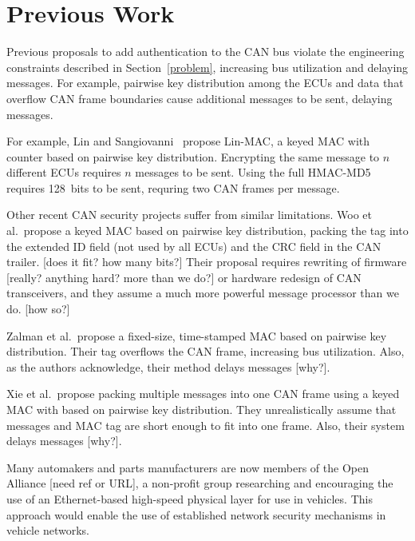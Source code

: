 \section{Previous Work}
\label{previous}

Previous proposals to add authentication to the CAN bus violate the engineering constraints described
in Section~\ref{problem}, increasing bus utilization and delaying messages.  For example, pairwise
key distribution among the ECUs and data that overflow CAN frame boundaries cause additional messages to be sent,
delaying messages.

For example, Lin and Sangiovanni~\cite{Lin-MAC} propose Lin-MAC, a keyed MAC with counter based on
pairwise key distribution.  Encrypting the same message to $n$ different ECUs requires $n$
messages to be sent.   Using the full HMAC-MD5 requires 128~bits to be sent, requring two CAN frames per message.

Other recent CAN security projects suffer from similar limitations. 
Woo et al.\ propose a keyed MAC based on pairwise key distribution,
packing the tag into the extended ID field (not used by all ECUs) and the CRC field in the CAN trailer. 
[does it fit? how many bits?]  Their proposal requires 
rewriting of firmware [really? anything hard? more than we do?] or hardware redesign of CAN transceivers, and 
they assume a much more powerful message processor than we do. [how so?]

Zalman et al.\ propose a fixed-size, time-stamped MAC based on pairwise key distribution.
Their tag overflows the CAN frame, increasing bus utilization.  Also, as the authors acknowledge,
their method delays messages [why?].

Xie et al.\ propose packing multiple messages into one CAN frame using a keyed MAC with 
based on pairwise key distribution.   They unrealistically assume that messages and MAC tag are short
enough to fit into one frame.  Also, their system delays messages [why?].


Many automakers and parts manufacturers are now members of the Open Alliance [need ref or URL], 
a non-profit group researching and encouraging the use of an Ethernet-based high-speed physical layer 
for use in vehicles.  This approach would enable the use of 
established network security mechanisms in vehicle networks.